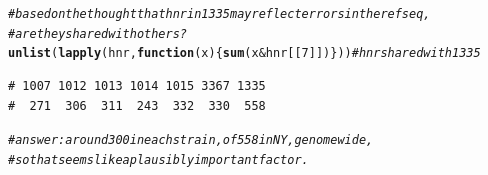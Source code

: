 \documentclass{article}\usepackage[]{graphicx}\usepackage[]{color}
\makeatletter
\newcommand{\hlnum}[1]{\textcolor[rgb]{0.686,0.059,0.569}{#1}}%
\newcommand{\hlcom}[1]{\textcolor[rgb]{0.678,0.584,0.686}{\textit{#1}}}%
\newcommand{\hlopt}[1]{\textcolor[rgb]{0,0,0}{#1}}%
\newcommand{\hlstd}[1]{\textcolor[rgb]{0.345,0.345,0.345}{#1}}%
\newcommand{\hlkwa}[1]{\textcolor[rgb]{0.161,0.373,0.58}{\textbf{#1}}}%
\newcommand{\hlkwc}[1]{\textcolor[rgb]{0.333,0.667,0.333}{#1}}%
\newcommand{\hlkwd}[1]{\textcolor[rgb]{0.737,0.353,0.396}{\textbf{#1}}}%
\newenvironment{kframe}{%
 \def\at@end@of@kframe{}%
 \ifinner\ifhmode%
  \def\at@end@of@kframe{\end{minipage}}%
  \begin{minipage}{\columnwidth}%
 \fi\fi%
 \def\FrameCommand##1{\hskip\@totalleftmargin \hskip-\fboxsep
 \colorbox{shadecolor}{##1}\hskip-\fboxsep
     \hskip-\linewidth \hskip-\@totalleftmargin \hskip\columnwidth}%
 \MakeFramed {\advance\hsize-\width
   \@totalleftmargin\z@ \linewidth\hsize
   \@setminipage}}%
 {\par\unskip\endMakeFramed%
 \at@end@of@kframe}
\newenvironment{knitrout}{}{} %
\makeatother
\begin{document}
\begin{knitrout}\footnotesize
{}\color{fgcolor}\begin{kframe}
\begin{alltt}
\hlcom{# based on the thought that hnr in 1335 may reflect errors in the ref seq, }
\hlcom{# are they shared with others?}
\hlkwd{unlist}\hlstd{(}\hlkwd{lapply}\hlstd{(hnr,} \hlkwa{function}\hlstd{(}\hlkwc{x}\hlstd{)\{}\hlkwd{sum}\hlstd{(x} \hlopt{&} \hlstd{hnr[[}\hlnum{7}\hlstd{]])\}))}                 \hlcom{# hnr shared with 1335}
\end{alltt}
\begin{verbatim}
# 1007 1012 1013 1014 1015 3367 1335 
#  271  306  311  243  332  330  558
\end{verbatim}
\begin{alltt}
\hlcom{# answer: around 300 in each strain, of 558 in NY, genomewide, }
\hlcom{# so that seems like a plausibly important factor.}


\end{alltt}
\end{kframe}
\end{knitrout}
\end{document}
